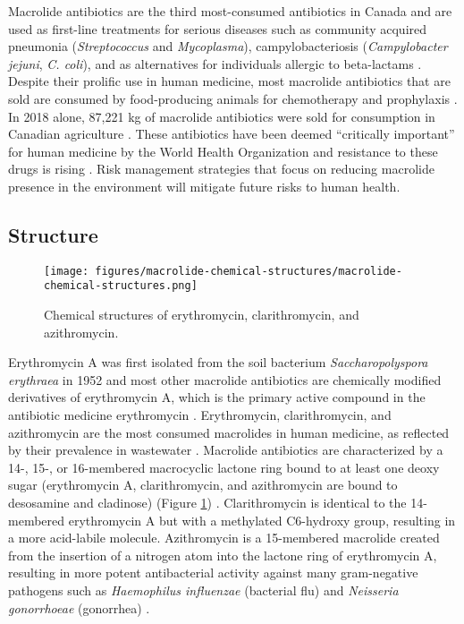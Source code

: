 Macrolide antibiotics are the third most-consumed antibiotics in Canada and are used as first-line treatments for serious diseases such as community acquired pneumonia (\textit{Streptococcus} and \textit{Mycoplasma}), campylobacteriosis (\textit{Campylobacter jejuni}, \textit{C. coli}), and as alternatives for individuals allergic to beta-lactams \parencite{PublicHealthAgencyofCanada.2020, CapeloMartinez.2019}.
Despite their prolific use in human medicine, most macrolide antibiotics that are sold are consumed by food-producing animals for chemotherapy and prophylaxis \parencite{CapeloMartinez.2019}.
In 2018 alone, 87,221 kg of macrolide antibiotics were sold for consumption in Canadian agriculture \parencite{PublicHealthAgencyofCanada.2020}.
These antibiotics have been deemed “critically important” for human medicine by the World Health Organization and resistance to these drugs is rising \parencite{Resistance.2017, PublicHealthAgencyofCanada.2020}.
Risk management strategies that focus on reducing macrolide presence in the environment will mitigate future risks to human health.

\subsection{Structure}

\begin{figure}[htb]
	\centering
		\texttt{[image: figures/macrolide-chemical-structures/macrolide-chemical-structures.png]}
	\caption{Chemical structures of erythromycin, clarithromycin, and azithromycin.}
	\label{fig:macrolide-chemical-structures}
\end{figure}

Erythromycin A was first isolated from the soil bacterium \textit{Saccharopolyspora erythraea} in 1952 and most other macrolide antibiotics are chemically modified derivatives of erythromycin A, which is the primary active compound in the antibiotic medicine erythromycin \parencite{Haight.1952}.
Erythromycin, clarithromycin, and azithromycin are the most consumed macrolides in human medicine, as reflected by their prevalence in wastewater \parencite{Miao.2004, RodriguezMozaz.2020}.
Macrolide antibiotics are characterized by a 14-, 15-, or 16-membered macrocyclic lactone ring bound to at least one deoxy sugar (erythromycin A, clarithromycin, and azithromycin are bound to desosamine and cladinose) (Figure \ref{fig:macrolide-chemical-structures}) \parencite{CapeloMartinez.2019}.
Clarithromycin is identical to the 14-membered erythromycin A but with a methylated C6-hydroxy group, resulting in a more acid-labile molecule.
Azithromycin is a 15-membered macrolide created from the insertion of a nitrogen atom into the lactone ring of erythromycin A, resulting in more potent antibacterial activity against many gram-negative pathogens such as \textit{Haemophilus influenzae} (bacterial flu) and \textit{Neisseria gonorrhoeae} (gonorrhea) \parencite{Yanagihara.2009}.

